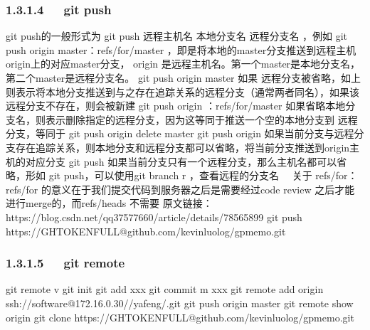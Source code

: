 \documentclass[letterpaper,12pt,english]{sphinxmanual}
\begin{document}
\subsubsection{1.3.1.4   git push}
\label{\detokenize{001software/001install/001._u7f51_u7ad9/github:git-push}}
\begin{sphinxVerbatim}[commandchars=\\\{\}]
\PYGZsh{} git push的一般形式为 git push \PYGZlt{}远程主机名\PYGZgt{} \PYGZlt{}本地分支名\PYGZgt{} \PYGZlt{}远程分支名\PYGZgt{} ，例如    git push origin master：refs/for/master    ，即是将本地的master分支推送到远程主机origin上的对应master分支， origin    是远程主机名。第一个master是本地分支名，第二个master是远程分支名。
\PYGZsh{} git push origin master
\PYGZsh{} 如果 远程分支被省略，如上则表示将本地分支推送到与之存在追踪关系的远程分支（通常两者同名），如果该远程分支不存在，则会被新建
\PYGZsh{} git push origin ：refs/for/master
\PYGZsh{} 如果省略本地分支名，则表示删除指定的远程分支，因为这等同于推送一个空的本地分支到 远程分支，等同于 git push origin \textendash{}delete master
\PYGZsh{} git push origin
\PYGZsh{} 如果当前分支与远程分支存在追踪关系，则本地分支和远程分支都可以省略，将当前分支推送到origin主机的对应分支
\PYGZsh{} git push
\PYGZsh{} 如果当前分支只有一个远程分支，那么主机名都可以省略，形如 git push，可以使用git branch \PYGZhy{}r ，查看远程的分支名
\PYGZsh{}  关于 refs/for：
\PYGZsh{} refs/for 的意义在于我们提交代码到服务器之后是需要经过code review    之后才能进行merge的，而refs/heads 不需要
\PYGZsh{} 原文链接：https://blog.csdn.net/qq\PYGZus{}37577660/article/details/78565899
  \PYGZhy{} git push https://\PYGZdl{}GH\PYGZus{}TOKEN\PYGZus{}FULL@github.com/kevinluolog/gp\PYGZhy{}memo.git
\end{sphinxVerbatim}


\subsubsection{1.3.1.5   git remote}
\label{\detokenize{001software/001install/001._u7f51_u7ad9/github:git-remote}}
\begin{sphinxVerbatim}[commandchars=\\\{\}]
git remote \PYGZhy{}v
git init
git add xxx
git commit \PYGZhy{}m \PYGZsq{}xxx\PYGZsq{}
git remote add origin ssh://software@172.16.0.30/\PYGZti{}/yafeng/.git
git push origin master
git remote show origin
git clone https://\PYGZdl{}GH\PYGZus{}TOKEN\PYGZus{}FULL@github.com/kevinluolog/gp\PYGZhy{}memo.git
\end{sphinxVerbatim}
\end{document}
